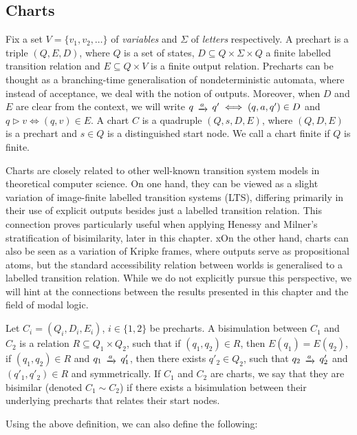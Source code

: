 \subsection{Charts}
Fix a set $V=\{v_1, v_2, \dots\}$ of \emph{variables} and $\Sigma$ of \emph{letters} respectively. A prechart is a triple $(Q,E,D)$, where $Q$ is a set of states, $D \subseteq Q \times \Sigma \times Q$ a finite labelled transition relation and $E \subseteq Q \times V$ is a finite output relation. Precharts can be thought as a branching-time generalisation of nondeterministic automata, where instead of acceptance, we deal with the notion of outputs. Moreover, when $D$ and $E$ are clear from the context, we will write $q \tr{a} q' \iff (q,a,q') \in D$ and $q \rhd v \iff (q,v) \in E$. A chart $C$ is a quadruple $(Q, s, D, E)$, where $(Q,D,E)$ is a prechart and $s \in Q$ is a distinguished start node. We call a chart finite if $Q$ is finite.
\begin{remark}\label{c3:rem:kripke}
	Charts are closely related to other well-known transition system models in theoretical computer science. On one hand, they can be viewed as a slight variation of image-finite labelled transition systems (LTS), differing primarily in their use of explicit outputs besides just a labelled transition relation. This connection proves particularly useful when applying Henessy and Milner’s stratification of bisimilarity, later in this chapter. xOn the other hand, charts can also be seen as a variation of Kripke frames, where outputs serve as propositional atoms, but the standard accessibility relation between worlds is generalised to a labelled transition relation. While we do not explicitly pursue this perspective, we will hint at the connections between the results presented in this chapter and the field of modal logic.
\end{remark}
\begin{definition}
	Let $C_i = (Q_i,D_i,E_i)$, $i \in \{1,2\}$ be precharts. A bisimulation between $C_1$ and $C_2$ is a relation ${R} \subseteq Q_1 \times Q_2$, such that  if $(q_1,q_2)\in R$, then $E(q_1)=E(q_2)$,  if $(q_1,q_2) \in R$ and $q_1 \tr{a} q'_1$, then there exists $q'_2 \in Q_2$, such that $q_2 \tr{a} q'_2$ and $(q'_1, q'_2) \in R$ and symmetrically. If $C_1$ and $C_2$ are charts, we say that they are bisimilar (denoted $C_1 \sim C_2$) if there exists a bisimulation between their underlying precharts that relates their start nodes.
\end{definition}
Using the above definition, we can also define the following:

